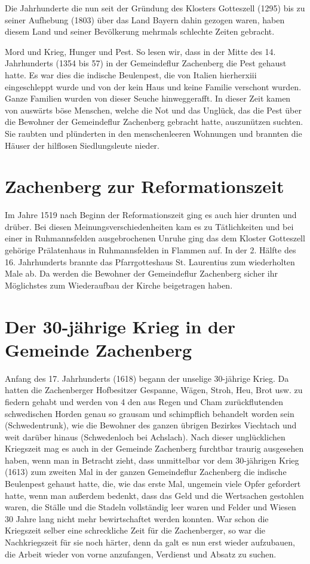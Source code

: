 \documentclass{book}
\begin{document}
Die Jahrhunderte die nun seit der Gründung des Klosters Gotteszell (1295) bis zu
seiner Aufhebung (1803) über das Land Bayern dahin gezogen waren, haben diesem
Land und seiner Bevölkerung mehrmals schlechte Zeiten gebracht.

Mord und Krieg, Hunger und Pest. So lesen wir, dass in der Mitte des 14.
Jahrhunderts (1354 bis 57) in der Gemeindeflur Zachenberg die Pest gehaust
hatte. Es war dies die indische Beulenpest, die von Italien hierherxiii
eingeschleppt wurde und von der kein Haus und keine Familie verschont wurden.
Ganze Familien wurden von dieser Seuche hinweggerafft. In dieser Zeit kamen von
auswärts böse Menschen, welche die Not und das Unglück, das die Pest über die
Bewohner der Gemeindeflur Zachenberg gebracht hatte, auszunützen suchten. Sie
raubten und plünderten in den menschenleeren Wohnungen und brannten die Häuser
der hilflosen Siedlungsleute nieder.

\section{Zachenberg zur Reformationszeit}

Im Jahre 1519 nach Beginn der Reformationszeit ging es auch hier drunten und
drüber. Bei diesen Meinungsverschiedenheiten kam es zu Tätlichkeiten und bei
einer in Ruhmannsfelden ausgebrochenen Unruhe ging das dem Kloster Gotteszell
gehörige Prälatenhaus in Ruhmannsfelden in Flammen auf. In der 2. Hälfte des 16.
Jahrhunderts brannte das Pfarrgotteshaus St. Laurentius zum wiederholten Male
ab. Da werden die Bewohner der Gemeindeflur Zachenberg sicher ihr Möglichstes
zum Wiederaufbau der Kirche beigetragen haben.

\section{Der 30-jährige Krieg in der Gemeinde Zachenberg}

Anfang des 17. Jahrhunderts (1618) begann der unselige 30-jährige Krieg. Da
hatten die Zachenberger Hofbesitzer Gespanne, Wägen, Stroh, Heu, Brot usw. zu
fiedern gehabt und werden von 4 den aus Regen und Cham zurückflutenden
schwedischen Horden genau so grausam und schimpflich behandelt worden sein
(Schwedentrunk), wie die Bewohner des ganzen übrigen Bezirkes Viechtach und weit
darüber hinaus (Schwedenloch bei Achslach). Nach dieser unglücklichen Kriegszeit
mag es auch in der Gemeinde Zachenberg furchtbar traurig ausgesehen haben, wenn
man in Betracht zieht, dass unmittelbar vor dem 30-jährigen Krieg (1613) zum
zweiten Mal in der ganzen Gemeindeflur Zachenberg die indische Beulenpest
gehaust hatte, die, wie das erste Mal, ungemein viele Opfer gefordert hatte,
wenn man außerdem bedenkt, dass das Geld und die Wertsachen gestohlen waren, die
Ställe und die Stadeln vollständig leer waren und Felder und Wiesen 30 Jahre
lang nicht mehr bewirtschaftet werden konnten. War schon die Kriegszeit selber
eine schreckliche Zeit für die Zachenberger, so war die Nachkriegszeit für sie
noch härter, denn da galt es nun erst wieder aufzubauen, die Arbeit wieder von
vorne anzufangen, Verdienst und Absatz zu suchen.
\end{document}
